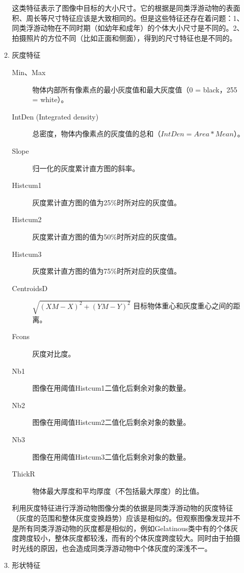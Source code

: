 \begin{enumerate}
\begin{enumerate}
这类特征表示了图像中目标的大小尺寸。它的根据是同类浮游动物的表面积、周长等尺寸特征应该是大致相同的。但是这些特征还存在着问题：1、同类浮游动物在不同时期（如幼年和成年）的个体大小尺寸是不同的。2、拍摄照片的方位不同（比如正面和侧面），得到的尺寸特征也是不同的。

\item 灰度特征

\begin{description}
    \item[Min、Max] 物体内部所有像素点的最小灰度值和最大灰度值（0 = black，255 = white）。
    \item[IntDen (Integrated density)] 总密度，物体内像素点的灰度值的总和（$IntDen = Area * Mean$）。
    \item[Slope] 归一化的灰度累计直方图的斜率。
    \item[Histcum1] 灰度累计直方图的值为25\%时所对应的灰度值。
    \item[Histcum2] 灰度累计直方图的值为50\%时所对应的灰度值。
    \item[Histcum3] 灰度累计直方图的值为75\%时所对应的灰度值。
    \item[CentroidsD] $\sqrt{(XM-X)^{2}+(YM-Y)^{2}}$ 目标物体重心和灰度重心之间的距离。
    \item[Fcons] 灰度对比度。
    \item[Nb1] 图像在用阈值Histcum1二值化后剩余对象的数量。
    \item[Nb2] 图像在用阈值Histcum2二值化后剩余对象的数量。
    \item[Nb3] 图像在用阈值Histcum3二值化后剩余对象的数量。
    \item[ThickR] 物体最大厚度和平均厚度（不包括最大厚度）的比值。
\end{description}

利用灰度特征进行浮游动物图像分类的依据是同类浮游动物的灰度特征（灰度的范围和整体灰度变换趋势）应该是相似的。但观察图像发现并不是所有同类浮游动物的灰度都是相似的，例如Gelatinous类中有的个体灰度跨度较小，整体灰度都较浅，而有的个体灰度跨度较大。同时由于拍摄时光线的原因，也会造成同类浮游动物中个体灰度的深浅不一。

\item 形状特征


\end{enumerate}
\end{enumerate}
